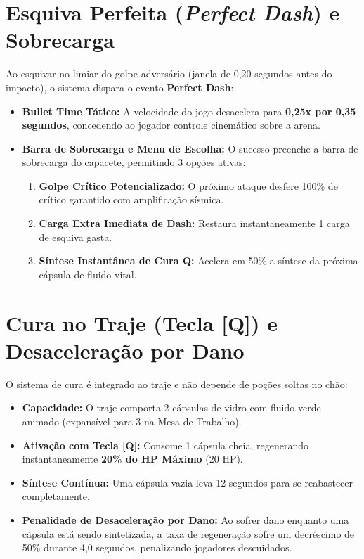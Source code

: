 \documentclass[a4paper,12pt]{report}
\begin{document}
\section{Esquiva Perfeita (\textit{Perfect Dash}) e Sobrecarga}
Ao esquivar no limiar do golpe adversário (janela de 0,20 segundos antes do impacto), o sistema dispara o evento \textbf{Perfect Dash}:
\begin{itemize}
    \item \textbf{Bullet Time Tático:} A velocidade do jogo desacelera para \textbf{0,25x por 0,35 segundos}, concedendo ao jogador controle cinemático sobre a arena.
    \item \textbf{Barra de Sobrecarga e Menu de Escolha:} O sucesso preenche a barra de sobrecarga do capacete, permitindo 3 opções ativas:
    \begin{enumerate}
        \item \textbf{Golpe Crítico Potencializado:} O próximo ataque desfere 100\% de crítico garantido com amplificação sísmica.
        \item \textbf{Carga Extra Imediata de Dash:} Restaura instantaneamente 1 carga de esquiva gasta.
        \item \textbf{Síntese Instantânea de Cura Q:} Acelera em 50\% a síntese da próxima cápsula de fluido vital.
    \end{enumerate}
\end{itemize}

\section{Cura no Traje (Tecla [Q]) e Desaceleração por Dano}
O sistema de cura é integrado ao traje e não depende de poções soltas no chão:
\begin{itemize}
    \item \textbf{Capacidade:} O traje comporta 2 cápsulas de vidro com fluido verde animado (expansível para 3 na Mesa de Trabalho).
    \item \textbf{Ativação com Tecla [Q]:} Consome 1 cápsula cheia, regenerando instantaneamente \textbf{20\% do HP Máximo} (20 HP).
    \item \textbf{Síntese Contínua:} Uma cápsula vazia leva 12 segundos para se reabastecer completamente.
    \item \textbf{Penalidade de Desaceleração por Dano:} Ao sofrer dano enquanto uma cápsula está sendo sintetizada, a taxa de regeneração sofre um decréscimo de 50\% durante 4,0 segundos, penalizando jogadores descuidados.
\end{itemize}
\end{document}
